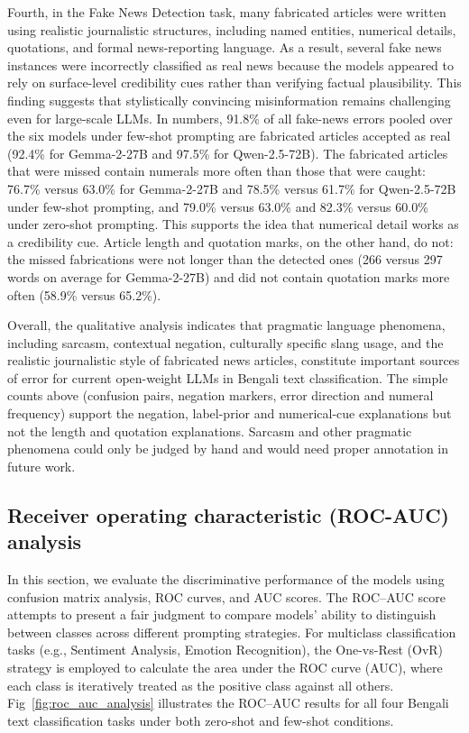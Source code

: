 \documentclass[10pt,letterpaper]{article}
\begin{document}
Fourth, in the Fake News Detection task, many fabricated articles were written using realistic journalistic structures, including named entities, numerical details, quotations, and formal news-reporting language. As a result, several fake news instances were incorrectly classified as real news because the models appeared to rely on surface-level credibility cues rather than verifying factual plausibility. This finding suggests that stylistically convincing misinformation remains challenging even for large-scale LLMs. In numbers, 91.8\% of all fake-news errors pooled over the six models under few-shot prompting are fabricated articles accepted as real (92.4\% for Gemma-2-27B and 97.5\% for Qwen-2.5-72B). The fabricated articles that were missed contain numerals more often than those that were caught: 76.7\% versus 63.0\% for Gemma-2-27B and 78.5\% versus 61.7\% for Qwen-2.5-72B under few-shot prompting, and 79.0\% versus 63.0\% and 82.3\% versus 60.0\% under zero-shot prompting. This supports the idea that numerical detail works as a credibility cue. Article length and quotation marks, on the other hand, do not: the missed fabrications were not longer than the detected ones (266 versus 297 words on average for Gemma-2-27B) and did not contain quotation marks more often (58.9\% versus 65.2\%).

Overall, the qualitative analysis indicates that pragmatic language phenomena, including sarcasm, contextual negation, culturally specific slang usage, and the realistic journalistic style of fabricated news articles, constitute important sources of error for current open-weight LLMs in Bengali text classification. The simple counts above (confusion pairs, negation markers, error direction and numeral frequency) support the negation, label-prior and numerical-cue explanations but not the length and quotation explanations. Sarcasm and other pragmatic phenomena could only be judged by hand and would need proper annotation in future work.




\subsection*{Receiver operating characteristic (ROC-AUC) analysis}
\label{sec:roc_auc_analysis}

In this section, we evaluate the discriminative performance of the models using confusion matrix analysis, ROC curves, and AUC scores. The ROC–AUC score attempts to present a fair judgment to compare models' ability to distinguish between classes across different prompting strategies. For multiclass classification tasks (e.g., Sentiment Analysis, Emotion Recognition), the One-vs-Rest (OvR) strategy is employed to calculate the area under the ROC curve (AUC), where each class is iteratively treated as the positive class against all others. Fig~\ref{fig:roc_auc_analysis} illustrates the ROC–AUC results for all four Bengali text classification tasks under both zero-shot and few-shot conditions.
\end{document}
